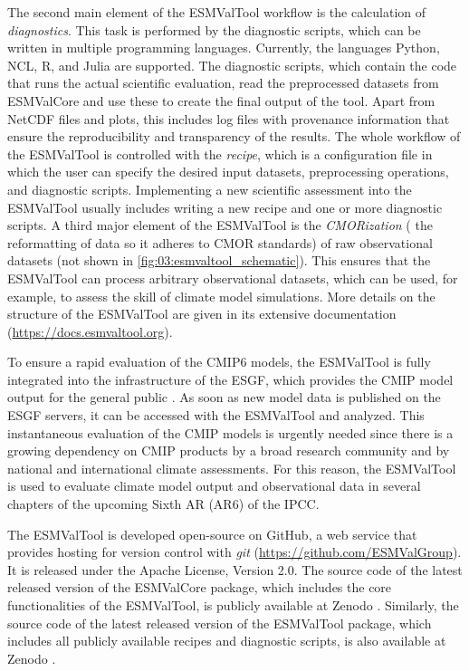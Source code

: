 The second main element of the \ac{ESMValTool} workflow is the calculation of
\emph{diagnostics}. This task is performed by the diagnostic scripts, which can
be written in multiple programming languages. Currently, the languages Python,
NCL, R, and Julia are supported. The diagnostic scripts, which contain the code
that runs the actual scientific evaluation, read the preprocessed datasets from
\ac{ESMValCore} and use these to create the final output of the tool. Apart
from \ac{NetCDF} files and plots, this includes log files with provenance
information that ensure the reproducibility and transparency of the results.
The whole workflow of the \ac{ESMValTool} is controlled with the \emph{recipe},
which is a configuration file in which the user can specify the desired input
datasets, preprocessing operations, and diagnostic scripts. Implementing a new
scientific assessment into the \ac{ESMValTool} usually includes writing a new
recipe and one or more diagnostic scripts. A third major element of the
\ac{ESMValTool} is the \emph{\acs{CMOR}ization} (\ie{} the reformatting of data
so it adheres to \ac{CMOR} standards) of raw observational datasets (not shown
in \cref{fig:03:esmvaltool_schematic}). This ensures that the \ac{ESMValTool}
can process arbitrary observational datasets, which can be used, for example,
to assess the skill of climate model simulations. More details on the structure
of the \ac{ESMValTool} are given in its extensive documentation
(\url{https://docs.esmvaltool.org}).

To ensure a rapid evaluation of the \acs{CMIP}6 models, the \ac{ESMValTool} is
fully integrated into the infrastructure of the \ac{ESGF}, which provides the
\ac{CMIP} model output for the general public \autocite{Eyring2016b}. As soon
as new model data is published on the \ac{ESGF} servers, it can be accessed
with the \ac{ESMValTool} and analyzed. This instantaneous evaluation of the
\ac{CMIP} models is urgently needed since there is a growing dependency on
\ac{CMIP} products by a broad research community and by national and
international climate assessments. For this reason, the \ac{ESMValTool} is used
to evaluate climate model output and observational data in several chapters of
the upcoming Sixth \acl{AR} (\acs{AR}6) of the \ac{IPCC}.

The \ac{ESMValTool} is developed open-source on GitHub, a web service that
provides hosting for version control with \emph{git}
(\url{https://github.com/ESMValGroup}). It is released under the Apache
License, Version 2.0. The source code of the latest released version of the
\ac{ESMValCore} package, which includes the core functionalities of the
\ac{ESMValTool}, is publicly available at Zenodo \autocite{Andela2020a}.
Similarly, the source code of the latest released version of the
\ac{ESMValTool} package, which includes all publicly available recipes and
diagnostic scripts, is also available at Zenodo \autocite{Andela2020}.


